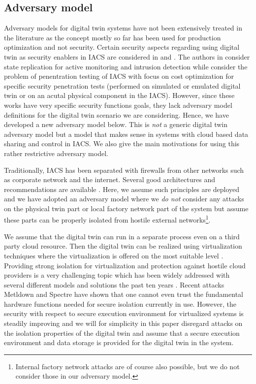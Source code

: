 \subsection{Adversary model}
\label{dtwinsecurity:adversary}
Adversary models for digital twin systems have not been extensively treated in the literature as the concept mostly so far has been used  for production optimization and not security. Certain security aspects regarding using digital twin as security enablers in IACS are considered in \cite{Eckhart2018}  and \cite{Bittion2018}. The authors in \cite{Eckhart2018} consider state replication for active monitoring and intrusion detection while \cite{Bittion2018} consider the problem of penentration testing of IACS with focus on cost optimization for specific security penetration tests (performed on simulated or emulated digital twin or on an acutal physical component in the IACS). However, since these works have very specific security functions goals, they lack adversary model definitions for the digital twin scenario we are considering. Hence, we have developed a new adversary model below. This is {\it not} a generic digital twin adversary model but a model that makes sense in systems with cloud based data sharing and control in IACS. We also give the main motivations for using this rather restrictive adversary model. 

Traditionally, IACS has been separated with firewalls from other networks such as corporate network and the internet.  Several good architectures and recommendations are available  \cite{Schrecker2016}. Here, we assume such principles are deployed and we have adopted an adversary model where we \textit{do not} consider any attacks on the physical twin part or local factory network part of the system but assume these parts can be properly isolated from hostile external networks\footnote{Internal factory network attacks are of course also possible, but we do not consider those in our adversary model.}. 

We assume that the digital twin can run in a separate process even on a third party cloud resource. Then the digital twin can be realized using virtualization techniques where the virtualization is offered on the most suitable level \cite{Smith2005}. Providing strong isolation for virtualization and protection against hostile cloud providers is a very challenging topic which has been widely addressed with several different models and solutions the past ten years \cite{Liu2015, Schuster2015, Paladi2017}. Recent attacks Metldown \cite{Lipp2018} and Spectre \cite{Kocher2019} have shown that one cannot even trust the fundamental hardware functions needed for secure isolation currently in use. However, the security with respect to secure execution environment for virtualized systems is steadily improving and we will for simplicity in this paper disregard attacks on the isolation properties of the digital twin and assume that a secure execution environment and data storage is provided for the digital twin in the system.

